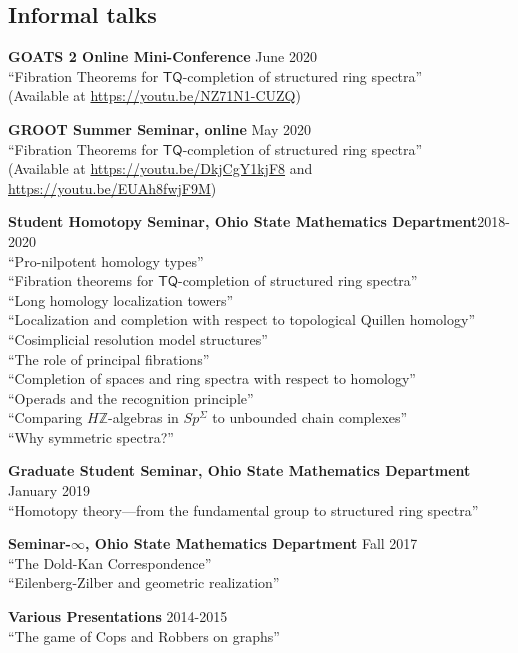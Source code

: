 \documentclass[10pt,letterpaper]{article}
\renewenvironment{itemize}{
  \begin{list}{}{
    \setlength{\leftmargin}{1.5em}
    \setlength{\itemsep}{0.25em}
    \setlength{\parskip}{0pt}
    \setlength{\parsep}{0.25em}
  }
}{
  \end{list}
}
\begin{document}
\subsection*{Informal talks}
\begin{itemize}
	
\item {\bf GOATS 2 Online Mini-Conference} \hfill {June 2020}\\
	``Fibration Theorems for $\mathsf{TQ}$-completion of structured ring spectra''\\
	(Available at \url{https://youtu.be/NZ71N1-CUZQ})\\
	
	
\item {\bf GROOT Summer Seminar, online} \hfill May 2020\\
``Fibration Theorems for $\mathsf{TQ}$-completion of structured ring spectra''\\
(Available at \url{https://youtu.be/DkjCgY1kjF8} and \url{https://youtu.be/EUAh8fwjF9M})\\

\item{\bf Student Homotopy Seminar, Ohio State Mathematics Department}\hfill 2018-2020\\
``Pro-nilpotent homology types''\\
``Fibration theorems for $\mathsf{TQ}$-completion of structured ring spectra''\\
``Long homology localization towers''\\
``Localization and completion with respect to topological Quillen homology''\\
``Cosimplicial resolution model structures''\\
``The role of principal fibrations''\\
``Completion of spaces and ring spectra with respect to homology''\\
``Operads and the recognition principle''\\
``Comparing $H\mathbb{Z}$-algebras in $Sp^\Sigma$ to unbounded chain complexes''\\
``Why symmetric spectra?''\\

\item{\bf Graduate Student Seminar, Ohio State Mathematics Department} \hfill January 2019\\
``Homotopy theory---from the fundamental group to structured ring spectra''\\


\item{\bf Seminar-$\infty$, Ohio State Mathematics Department} \hfill Fall 2017\\
``The Dold-Kan Correspondence''\\
``Eilenberg-Zilber and geometric realization''\\


\item {\bf Various Presentations} \hfill 2014-2015\\
``The game of Cops and Robbers on graphs''

\end{itemize}
\end{document}
